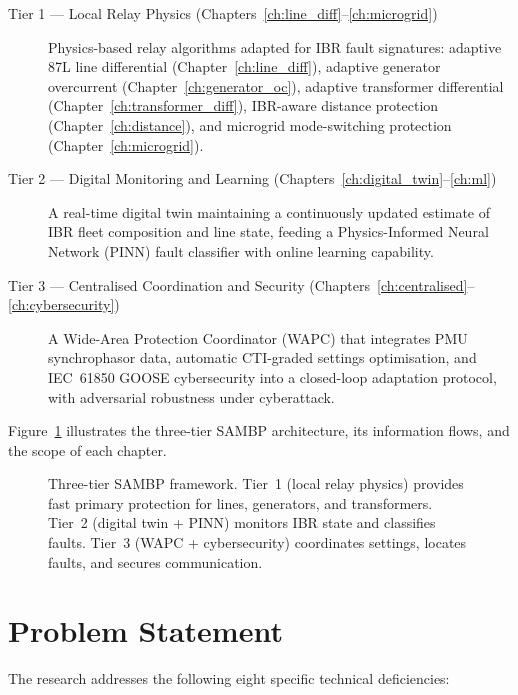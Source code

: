 \begin{description}
\item[Tier 1 --- Local Relay Physics (Chapters~\ref{ch:line_diff}--\ref{ch:microgrid})]
  Physics-based relay algorithms adapted for IBR fault signatures: adaptive
  87L line differential (Chapter~\ref{ch:line_diff}), adaptive generator overcurrent
  (Chapter~\ref{ch:generator_oc}), adaptive transformer differential (Chapter~\ref{ch:transformer_diff}),
  IBR-aware distance protection (Chapter~\ref{ch:distance}), and microgrid mode-switching
  protection (Chapter~\ref{ch:microgrid}).

\item[Tier 2 --- Digital Monitoring and Learning (Chapters~\ref{ch:digital_twin}--\ref{ch:ml})]
  A real-time digital twin maintaining a continuously updated estimate of
  IBR fleet composition and line state, feeding a Physics-Informed Neural
  Network (PINN) fault classifier with online learning capability.

\item[Tier 3 --- Centralised Coordination and Security (Chapters~\ref{ch:centralised}--\ref{ch:cybersecurity})]
  A Wide-Area Protection Coordinator (WAPC) that integrates PMU
  synchrophasor data, automatic CTI-graded settings optimisation, and
  IEC~61850 GOOSE cybersecurity into a closed-loop adaptation protocol,
  with adversarial robustness under cyberattack.
\end{description}

Figure~\ref{fig:ch1_sambp_architecture} illustrates the three-tier SAMBP
architecture, its information flows, and the scope of each chapter.

\begin{figure}[htbp]
  \centering
  
  \caption{Three-tier SAMBP framework. Tier~1 (local relay physics) provides
           fast primary protection for lines, generators, and transformers.
           Tier~2 (digital twin + PINN) monitors IBR state and classifies faults.
           Tier~3 (WAPC + cybersecurity) coordinates settings, locates faults,
           and secures communication.}
  \label{fig:ch1_sambp_architecture}
\end{figure}

\section{Problem Statement}
\label{sec:ch1_problem}

The research addresses the following eight specific technical deficiencies:

